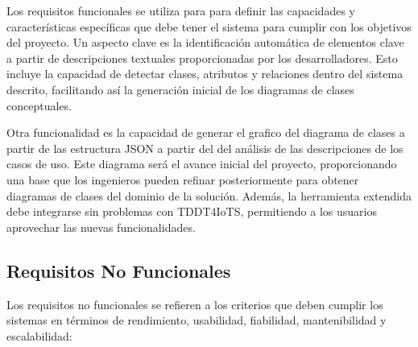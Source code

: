 Los requisitos funcionales se utiliza para para definir las capacidades y características específicas que debe tener el sistema para cumplir con los objetivos del proyecto. Un aspecto clave es la identificación automática de elementos clave a partir de descripciones textuales proporcionadas por los desarrolladores. Esto incluye la capacidad de detectar clases, atributos y relaciones dentro del sistema descrito, facilitando así la generación inicial de los diagramas de clases conceptuales.

Otra funcionalidad es la capacidad de generar el grafico del diagrama de clases a partir de las estructura JSON a partir del del análisis de las descripciones de los casos de uso. Este diagrama será el avance inicial del proyecto, proporcionando una base que los ingenieros pueden refinar posteriormente para obtener diagramas de clases del dominio de la solución. Además, la herramienta extendida debe integrarse sin problemas con TDDT4IoTS, permitiendo a los usuarios aprovechar las nuevas funcionalidades.

\subsection{Requisitos No Funcionales}

Los requisitos no funcionales se refieren a los criterios que deben cumplir los sistemas en términos de rendimiento, usabilidad, fiabilidad, mantenibilidad y escalabilidad:


